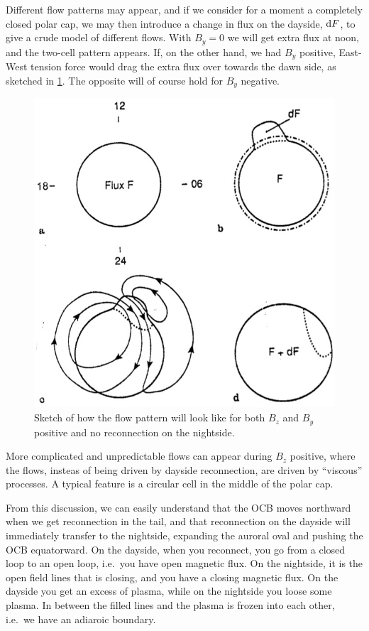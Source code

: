 Different flow patterns may appear, and if we consider for a moment a completely closed polar cap, we may then introduce a change in flux on the dayside, \(\textnormal{d}F\), to give a crude model of different flows. With \(B_y=0\) we will get extra flux at noon, and the two-cell pattern appears. If, on the other hand, we had \(B_y\) positive, East-West tension force would drag the extra flux over towards the dawn side, as sketched in \cref{fig:L13_flow_from_positive_By}. The opposite will of course hold for \(B_y\) negative.
\begin{figure}[t]
    \centering
    \includegraphics[width=.4\linewidth]{bilder/L13_flow_from_positive_By.jpg}
    \caption{Sketch of how the flow pattern will look like for both \(B_z\) and \(B_y\) positive and no reconnection on the nightside.}\label{fig:L13_flow_from_positive_By}
\end{figure}

More complicated and unpredictable flows can appear during \(B_z\) positive, where the flows, insteas of being driven by dayside reconnection, are driven by ``viscous'' processes. A typical feature is a circular cell in the middle of the polar cap.

From this discussion, we can easily understand that the OCB moves northward when we get reconnection in the tail, and that reconnection on the dayside will immediately transfer to the nightside, expanding the auroral oval and pushing the OCB equatorward. On the dayside, when you reconnect, you go from a closed loop to an open loop, i.e.\ you have open magnetic flux. On the nightside, it is the open field lines that is closing, and you have a closing magnetic flux. On the dayside you get an excess of plasma, while on the nightside you loose some plasma. In between the filled lines and the plasma is frozen into each other, i.e.\ we have an adiaroic boundary.

